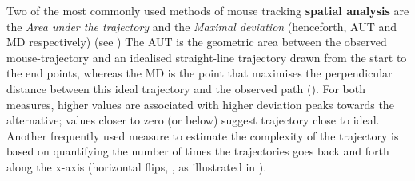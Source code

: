 \documentclass{article}
\begin{document}
Two of the most commonly used methods of mouse tracking \textbf{spatial analysis} are the \textit{Area under the trajectory} and the \textit{Maximal deviation} (henceforth, AUT and MD respectively) (see \citealp{Freeman2010})
The AUT is the geometric area between the observed mouse-trajectory and an idealised straight-line trajectory drawn from the start to the end points, whereas the MD is the point that maximises the perpendicular distance between this ideal trajectory and the observed path
(). For both measures, higher values are associated with higher deviation peaks towards the alternative; values closer to zero (or below) suggest trajectory close to ideal. 
Another frequently used measure to estimate the complexity of the trajectory is based on quantifying the number of times the trajectories goes back and forth along the x-axis (horizontal flips, \citealp{Dale2011}, as illustrated in ).
\end{document}
